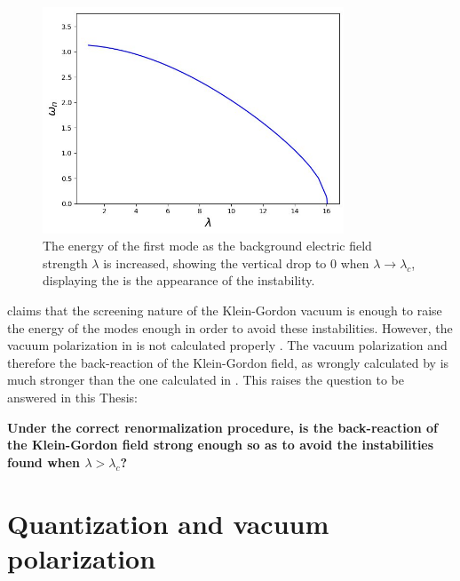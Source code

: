 \begin{figure}[t]
	\centering
	\includegraphics[width=0.8\textwidth]{figures/dirichlet/eigenvalues-external-field-approximation.png}
	\caption{The energy of the first mode as the background electric field strength $\lambda$ is increased, showing the vertical drop to 0 when $\lambda\to \lambda_c$, displaying the is the appearance of the instability. }
	\label{fig:figures-eigenvalues-external-field-approximation-png}
\end{figure}

\cite{Ambjorn1983} claims that the screening nature of the Klein-Gordon vacuum is enough to raise the energy of the modes enough in order to avoid these instabilities. However, the vacuum polarization in \cite{Ambj1983} is not calculated properly \cite{Wernersson2020}. The vacuum polarization and therefore the back-reaction of the Klein-Gordon field, as wrongly calculated by \cite{Ambj1983} is much stronger than the one calculated in \cite{Wernersson2020}. This raises the question to be answered in this Thesis: 
\begin{center}
    \textbf{Under the correct renormalization procedure, is the back-reaction of the Klein-Gordon field strong enough so as to avoid the instabilities found when $\lambda > \lambda_c$?}
\end{center}
\begin{center}
    \tex
\end{center}

		\section{Quantization and vacuum polarization}


